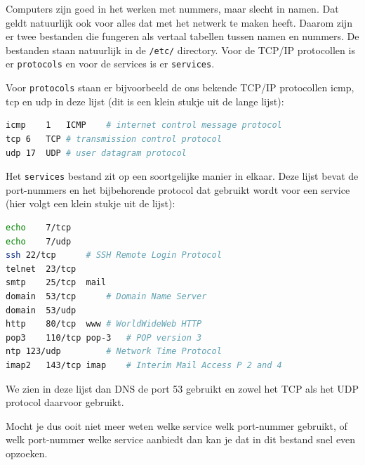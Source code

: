 Computers zijn goed in het werken met nummers, maar slecht in namen. Dat geldt natuurlijk ook voor alles dat met het netwerk te maken heeft. Daarom zijn er twee bestanden die fungeren als vertaal tabellen tussen namen en nummers. De bestanden staan natuurlijk in de \texttt{/etc/} directory. Voor de TCP/IP protocollen is er \texttt{protocols} en voor de services is er \texttt{services}.

Voor \texttt{protocols} staan er bijvoorbeeld de ons bekende TCP/IP protocollen icmp, tcp en udp in deze lijst (dit is een klein stukje uit de lange lijst): 
\begin{lstlisting}[language=bash]
icmp	1	ICMP	# internet control message protocol
tcp	6	TCP	# transmission control protocol
udp	17	UDP	# user datagram protocol
\end{lstlisting}

Het \texttt{services} bestand zit op een soortgelijke manier in elkaar. Deze lijst bevat de port-nummers en het bijbehorende protocol dat gebruikt wordt voor een service (hier volgt een klein stukje uit de lijst):
\begin{lstlisting}[language=bash]
echo	7/tcp
echo	7/udp
ssh	22/tcp		# SSH Remote Login Protocol
telnet	23/tcp
smtp	25/tcp	mail
domain	53/tcp		# Domain Name Server
domain	53/udp
http	80/tcp	www	# WorldWideWeb HTTP
pop3	110/tcp	pop-3	# POP version 3
ntp	123/udp			# Network Time Protocol
imap2	143/tcp	imap	# Interim Mail Access P 2 and 4
\end{lstlisting}
We zien in deze lijst dan DNS de port 53 gebruikt en zowel het TCP als het UDP protocol daarvoor gebruikt.

Mocht je dus ooit niet meer weten welke service welk port-nummer gebruikt, of welk port-nummer welke service aanbiedt dan kan je dat in dit bestand snel even opzoeken.

